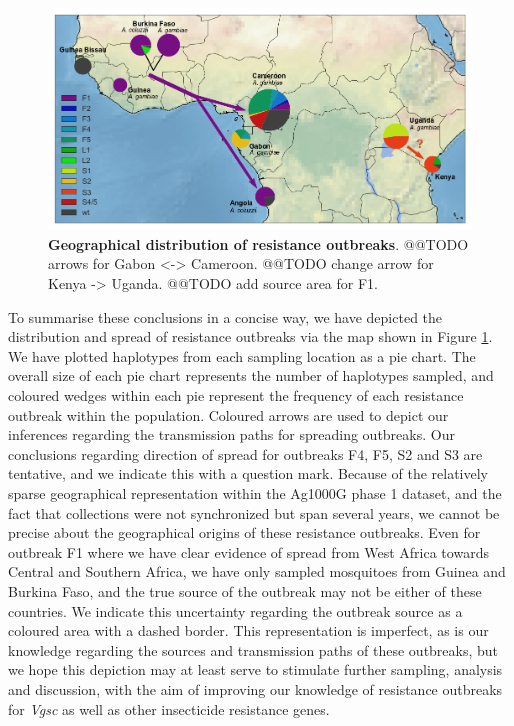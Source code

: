 \documentclass[a4paper,11pt,abstracton]{scrartcl}
\begin{document}
%
\begin{figure}[!b]
  \includegraphics[width=1.1\linewidth,center]{artwork/fig_map.png}
  \caption{\textbf{Geographical distribution of resistance outbreaks}. @@TODO arrows for Gabon <-> Cameroon. @@TODO change arrow for Kenya -> Uganda. @@TODO add source area for F1.}
  \label{fig:map}
\end{figure}


%
To summarise these conclusions in a concise way, we have depicted the distribution and spread of resistance outbreaks via the map shown in Figure \ref{fig:map}.
%
We have plotted haplotypes from each sampling location as a pie chart.
%
The overall size of each pie chart represents the number of haplotypes sampled, and coloured wedges within each pie represent the frequency of each resistance outbreak within the population.
%
Coloured arrows are used to depict our inferences regarding the transmission paths for spreading outbreaks.
%
Our conclusions regarding direction of spread for outbreaks F4, F5, S2 and S3 are tentative, and we indicate this with a question mark. 
%
Because of the relatively sparse geographical representation within the Ag1000G phase 1 dataset, and the fact that collections were not synchronized but span several years, we cannot be precise about the geographical origins of these resistance outbreaks.
%
Even for outbreak F1 where we have clear evidence of spread from West Africa towards Central and Southern Africa, we have only sampled mosquitoes from Guinea and Burkina Faso, and the true source of the outbreak may not be either of these countries.
%
We indicate this uncertainty regarding the outbreak source as a coloured area with a dashed border.
%
This representation is imperfect, as is our knowledge regarding the sources and transmission paths of these outbreaks, but we hope this depiction may at least serve to stimulate further sampling, analysis and discussion, with the aim of improving our knowledge of resistance outbreaks for \textit{Vgsc} as well as other insecticide resistance genes.
\end{document}
